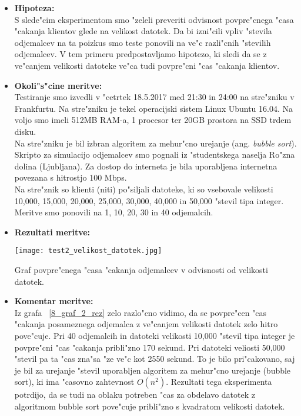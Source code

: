 \begin{itemize}
	\item \textbf{Hipoteza: }  \\
		S slede"cim eksperimentom smo "zeleli preveriti odvisnost povpre"cnega "casa "cakanja klientov glede na velikost datotek. Da bi izni"cili vpliv "stevila odjemalcev na ta poizkus smo teste ponovili na ve"c razli"cnih "stevilih odjemalcev. V tem primeru predpostavljamo hipotezo, ki sledi da se z ve"canjem velikosti datoteke ve"ca tudi povpre"cni "cas "cakanja klientov. 
			
	\item \textbf{Okoli"s"cine meritve: } \\
		Testiranje smo izvedli v "cetrtek 18.5.2017 med 21:30 in 24:00 na stre"zniku v Frankfurtu. Na stre"zniku je tekel operacijski sistem Linux Ubuntu 16.04. Na voljo smo imeli 512MB RAM-a, 1 procesor ter 20GB prostora na SSD trdem disku.\\ Na stre"zniku je bil izbran algoritem za mehur"cno urejanje (ang. \textit{bubble sort}). Skripto za simulacijo odjemalcev smo pognali iz "studentskega naselja Ro"zna dolina (Ljubljana). Za dostop do interneta je bila uporabljena internetna povezana s hitrostjo 100 Mbps.\\ Na stre"znik so klienti (niti) po"siljali datoteke, ki so vsebovale velikosti 10,000, 15,000, 20,000, 25,000, 30,000, 40,000 in 50,000 "stevil tipa integer. Meritve smo ponovili na 1, 10, 20, 30 in 40 odjemalcih.  

 	\item \textbf{Rezultati meritve: }  \\
 	
    \begin{table}[!h]
      \centering
        \texttt{[image: test2\_velikost\_datotek.jpg]}
      \caption{Graf povpre"cnega "casa "cakanja odjemalcev v odvisnosti od velikosti datotek.}		
      \label{8_graf_2_rez}
    \end{table}
		
    \pagebreak
	\item \textbf{Komentar meritve: } \\ 
		Iz grafa ~\ref{8_graf_2_rez} zelo razlo"cno vidimo, da se povpre"cen "cas "cakanja posameznega odjemalca z ve"canjem velikosti datotek zelo hitro pove"cuje. Pri 40 odjemalcih in datoteki velikosti 10,000 "stevil tipa integer je povpre"cni "cas "cakanja pribli"zno 170 sekund. Pri datoteki veliosti 50,000 "stevil pa ta "cas zna"sa "ze ve"c kot 2550 sekund. To je bilo pri"cakovano, saj je bil za urejanje "stevil uporabljen algoritem za mehur"cno urejanje (bubble sort), ki ima "casovno zahtevnost $O(n^2)$. Rezultati tega eksperimenta potrdijo, da se tudi na oblaku potreben "cas za obdelavo datotek z algoritmom bubble sort pove"cuje pribli"zno s kvadratom velikosti datotek. 
\end{itemize}


